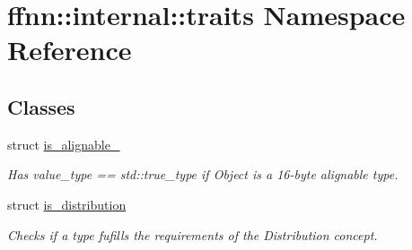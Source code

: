 \hypertarget{namespaceffnn_1_1internal_1_1traits}{\section{ffnn\-:\-:internal\-:\-:traits Namespace Reference}
\label{namespaceffnn_1_1internal_1_1traits}
}
\subsection*{Classes}
\begin{DoxyCompactItemize}
\item 
struct \hyperlink{structffnn_1_1internal_1_1traits_1_1is__alignable__128}{is\-\_\-alignable\-\_}
\begin{DoxyCompactList}\small\item\em Has {\ttfamily value\-\_\-type == std\-::true\-\_\-type} if {\ttfamily Object} is a 16-\/byte alignable type. \end{DoxyCompactList}\item 
struct \hyperlink{structffnn_1_1internal_1_1traits_1_1is__distribution}{is\-\_\-distribution}
\begin{DoxyCompactList}\small\item\em Checks if a type fufills the requirements of the Distribution concept. \end{DoxyCompactList}\end{DoxyCompactItemize}
